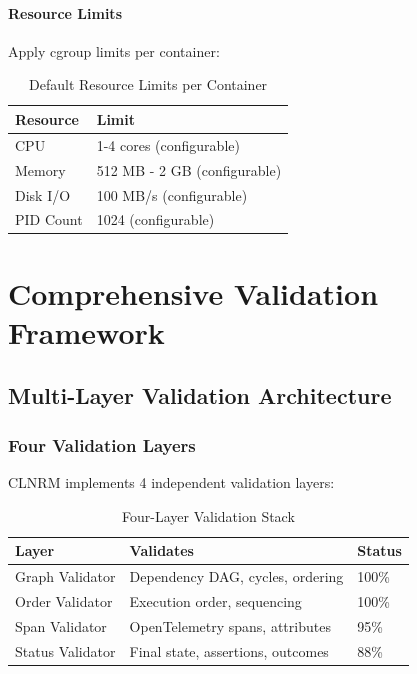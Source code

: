 \documentclass[12pt,twoside,openright]{book}
\theoremstyle{plain}
\theoremstyle{definition}
\theoremstyle{remark}
\begin{document}
\subsection{Resource Limits}

Apply cgroup limits per container:

\begin{table}[H]
\centering
\begin{tabular}{|l|l|}
\hline
\textbf{Resource} & \textbf{Limit} \\
\hline
CPU & 1-4 cores (configurable) \\
\hline
Memory & 512 MB - 2 GB (configurable) \\
\hline
Disk I/O & 100 MB/s (configurable) \\
\hline
PID Count & 1024 (configurable) \\
\hline
\end{tabular}
\caption{Default Resource Limits per Container}
\label{tab:resource_limits}
\end{table}


\part{Comprehensive Validation Framework}

\chapter{Multi-Layer Validation Architecture}

\section{Four Validation Layers}

CLNRM implements 4 independent validation layers:

\begin{table}[H]
\centering
\begin{tabular}{|l|p{3.5cm}|p{2cm}|}
\hline
\textbf{Layer} & \textbf{Validates} & \textbf{Status} \\
\hline
Graph Validator & Dependency DAG, cycles, ordering & 100\% \\
\hline
Order Validator & Execution order, sequencing & 100\% \\
\hline
Span Validator & OpenTelemetry spans, attributes & 95\% \\
\hline
Status Validator & Final state, assertions, outcomes & 88\% \\
\hline
\end{tabular}
\caption{Four-Layer Validation Stack}
\label{tab:validation_layers}
\end{table}
\end{document}
